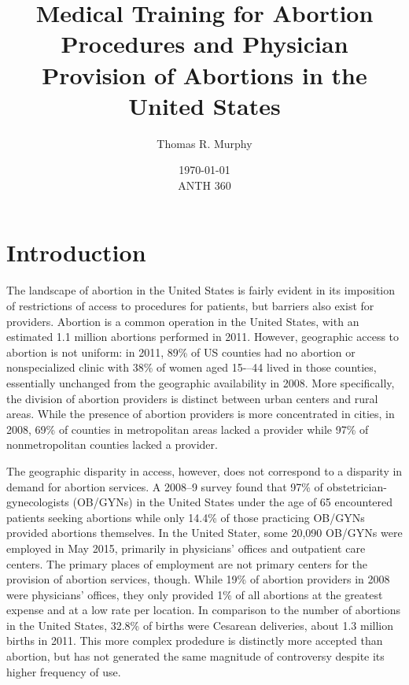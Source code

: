 \documentclass[letterpaper, 12pt]{article}
\title{Medical Training for Abortion Procedures and Physician Provision of Abortions in the United States}
\author{Thomas R. Murphy}
\date{\today\\ANTH 360}
\begin{document}
\maketitle


\section*{Introduction}

The landscape of abortion in the United States is fairly evident in its imposition of restrictions of access to procedures for patients, but barriers also exist for providers.
Abortion is a common operation in the United States, with an estimated 1.1 million abortions performed in 2011. \autocite[pg. 7]{jones_abortion_2014}
However, geographic access to abortion is not uniform: in 2011, 89\% of US counties had no abortion or nonspecialized clinic with 38\% of women aged 15-–44 lived in those counties, essentially unchanged from the geographic availability in 2008. \autocite[pg. 7]{jones_abortion_2014}
More specifically, the division of abortion providers is distinct between urban centers and rural areas.
While the presence of abortion providers is more concentrated in cities, in 2008, 69\% of counties in metropolitan areas lacked a provider while 97\% of nonmetropolitan counties lacked a provider. \autocite[pg. 46]{jones_abortion_2011}

The geographic disparity in access, however, does not correspond to a disparity in demand for abortion services.
A 2008--9 survey found that 97\% of obstetrician-gynecologists (OB/GYNs) in the United States under the age of 65 encountered patients seeking abortions while only 14.4\% of those practicing OB/GYNs provided abortions themselves. \autocite[pg. 611]{stulberg_abortion_2011}
In the United Stater, some 20,090 OB/GYNs were employed in May 2015, primarily in physicians' offices and outpatient care centers. \autocite{occupational_employment_and_wages_may_2015}
The primary places of employment are not primary centers for the provision of abortion services, though.
While 19\% of abortion providers in 2008 were physicians' offices, they only provided 1\% of all abortions at the greatest expense and at a low rate per location. \autocite[pg. 46--7]{jones_abortion_2011}
In comparison to the number of abortions in the United States, 32.8\% of births were Cesarean deliveries, about 1.3 million births in 2011. \autocite[pg. 5]{martin_births_2013}
This more complex prodedure is distinctly more accepted than abortion, but has not generated the same magnitude of controversy despite its higher frequency of use.
\end{document}
